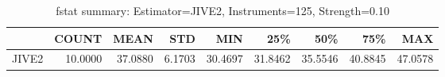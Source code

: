 \begin{table}[ht]
\centering
\caption{fstat summary: Estimator=JIVE2, Instruments=125, Strength=0.10}
\begin{tabular}{lrrrrrrrr}
\toprule
 & COUNT & MEAN & STD & MIN & 25\% & 50\% & 75\% & MAX \\
\midrule
JIVE2 & 10.0000 & 37.0880 & 6.1703 & 30.4697 & 31.8462 & 35.5546 & 40.8845 & 47.0578 \\
\bottomrule
\end{tabular}
\end{table}
